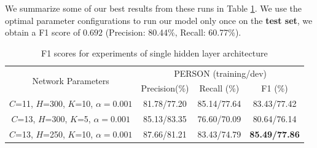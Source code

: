 \documentclass[letterpaper]{article}
\begin{document}
We summarize some of our best results from these runs in Table \ref{tab:network}. We use the optimal parameter configurations to run our model only once on the \textbf{test set},
we obtain a F1 score of $0.692$ (Precision: 80.44\%, Recall: 60.77\%).
\begin{table}[h]
\begin{center}
\begin{tabular}{|c|c|c|c|}
\hline
\multirow{2}{*}{Network Parameters} & 
\multicolumn{3}{|c|}{PERSON (training/dev)}
\\
\hhline{~---}
& Precision(\%) & Recall (\%) & F1 (\%) \\
\hline
$C$=11, $H$=300, $K$=10, $\alpha=0.001$ & 81.78/77.20 & 85.14/77.64 & 83.43/77.42
\\ \hline
$C$=13, $H$=300, $K$=5, $\alpha=0.001$ &
85.13/83.35 & 76.60/70.09 & 80.64/76.14
\\ \hline
$C$=13, $H$=250, $K$=10, $\alpha=0.001$ & 87.66/81.21 & 83.43/74.79 & \textbf{85.49/77.86} \\
\hline
\end{tabular}
\caption{F1 scores for experiments of single hidden layer architecture}
\label{tab:network}
\end{center}
\end{table}
\end{document}
